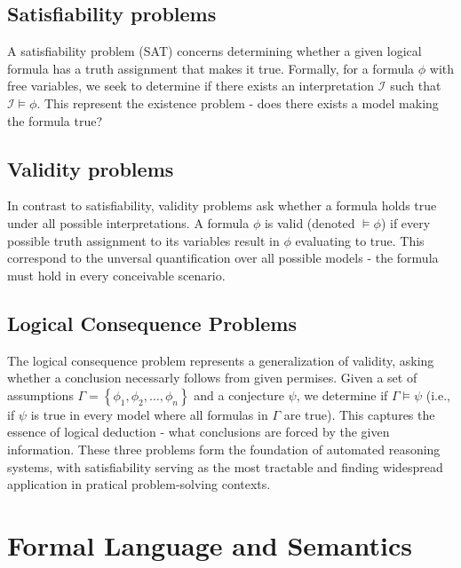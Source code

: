 \documentclass[a4paper]{article}
\theoremstyle{definition}
\begin{document}
\subsection{Satisfiability problems}
A satisfiability problem (SAT) concerns determining whether a given logical formula has a truth assignment that makes it true. Formally,
for a formula \( \phi \) with free variables, we seek to determine if there exists an interpretation \( \mathcal{I} \) such that \( \mathcal{I} \models \phi \). This 
represent the existence problem - does there exists a model making the formula true?
\subsection{Validity problems}
In contrast to satisfiability, validity problems ask whether a formula holds true under all possible interpretations.
A formula \( \phi \) is valid (denoted \( \models \phi \)) if every possible truth assignment to its variables result in 
\( \phi \) evaluating to true. This correspond to the unversal quantification over all possible models - the formula must 
hold in every conceivable scenario.
\subsection{Logical Consequence Problems}
The logical consequence problem represents a generalization of validity, asking whether a conclusion necessarly follows from 
given permises. Given a set of assumptions \( \varGamma = \left\{ \phi_1, \phi_2, \ldots, \phi_n \right\} \) and a conjecture 
\( \psi \), we determine if \( \varGamma \models \psi \) (i.e., if \( \psi \) is true in every model where all formulas 
in \( \varGamma \) are true). This captures the essence of logical deduction - what conclusions are forced by the given information.
\vspace{1em}
\noindent 
\newline
These three problems form the foundation of automated reasoning systems, with satisfiability 
serving as the most tractable and finding widespread application in pratical problem-solving contexts.
\section{Formal Language and Semantics}
\end{document}
